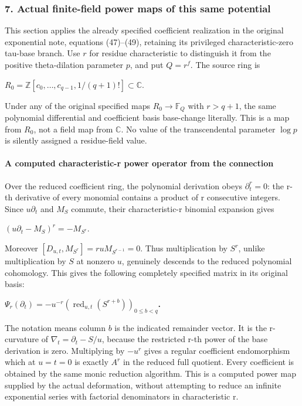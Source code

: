 \subsubsection{7. Actual finite-field power maps of this same potential}\label{endpoint-f1_scaling--actual-finite-field-power-maps-of-this-same-potential}

This section applies the already specified coefficient realization in the original exponential note, equations (47)--(49), retaining its privileged characteristic-zero tau-base branch. Use \(r\) for residue characteristic to distinguish it from the positive theta-dilation parameter \(p\), and put \(Q=r^f\). The source ring is

\(R_0=\mathbb Z[c_0,\ldots,c_{q-1},1/(q+1)!]\subset\mathbb C\).

Under any of the original specified maps \(R_0\to\mathbb F_Q\) with \(r>q+1\), the same polynomial differential and coefficient basis base-change literally. This is a map from \(R_0\), not a field map from \(\mathbb C\). No value of the transcendental parameter \(\log p\) is silently assigned a residue-field value.

\paragraph{A computed characteristic-r power operator from the connection}\label{endpoint-f1_scaling--a-computed-characteristic-r-power-operator-from-the-connection}

Over the reduced coefficient ring, the polynomial derivation obeys \(\partial_t^r=0\): the r-th derivative of every monomial contains a product of r consecutive integers. Since \(u \partial_t\) and \(M_S\) commute, their characteristic-r binomial expansion gives

\((u \partial_t-M_S)^r=-M_{S^r}\).

Moreover \([D_{u,t},M_{S^r}]=r u M_{S^{r-1}}=0\). Thus multiplication by \(S^r\), unlike multiplication by \(S\) at nonzero \(u\), genuinely descends to the reduced polynomial cohomology. This gives the following completely specified matrix in its original basis:

\textbf{\(\Psi_r(\partial_t)=-u^{-r} (\operatorname{red}_{u,t}(S^{r+b}))_{0\le b<q}\).}

The notation means column \(b\) is the indicated remainder vector. It is the r-curvature of \(\nabla_t=\partial_t-S/u\), because the restricted r-th power of the base derivation is zero. Multiplying by \(-u^r\) gives a regular coefficient endomorphism which at \(u=t=0\) is exactly \(A^r\) in the reduced full quotient. Every coefficient is obtained by the same monic reduction algorithm. This is a computed power map supplied by the actual deformation, without attempting to reduce an infinite exponential series with factorial denominators in characteristic r.

